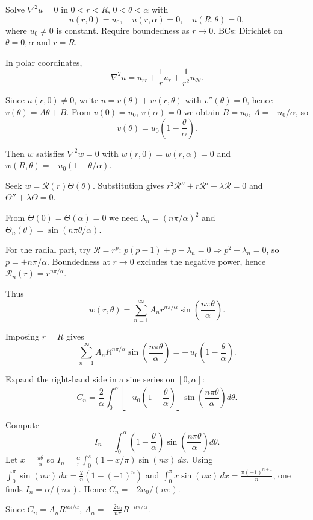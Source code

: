 \documentclass[a4paper,11pt]{article} %
\begin{document}
\begin{problembox}
Solve $\nabla^2 u=0$ in $0<r<R$, $0<\theta<\alpha$ with
\[
u(r,0)=u_0,\quad
u(r,\alpha)=0,\quad
u(R,\theta)=0,
\]
where $u_0\neq0$ is constant. Require boundedness as $r\to0$.
BCs: Dirichlet on $\theta=0,\alpha$ and $r=R$.
\end{problembox}

In polar coordinates,
\[
\nabla^2 u=u_{rr}+\frac1r u_r+\frac1{r^2}u_{\theta\theta}.
\]

Since $u(r,0)\neq0$, write $u=v(\theta)+w(r,\theta)$ with $v''(\theta)=0$, hence
$v(\theta)=A\theta+B$. From $v(0)=u_0$, $v(\alpha)=0$ we obtain
$B=u_0$, $A=-u_0/\alpha$, so
\[
v(\theta)=u_0\!\left(1-\frac{\theta}{\alpha}\right).
\]

Then $w$ satisfies $\nabla^2 w=0$ with
$w(r,0)=w(r,\alpha)=0$ and
$w(R,\theta)=-u_0(1-\theta/\alpha)$.

Seek $w=\mathcal R(r)\Theta(\theta)$. Substitution gives
$r^2\mathcal R''+r\mathcal R'-\lambda\mathcal R=0$ and
$\Theta''+\lambda\Theta=0$.

From $\Theta(0)=\Theta(\alpha)=0$ we need
$\lambda_n=(n\pi/\alpha)^2$ and
$\Theta_n(\theta)=\sin(n\pi\theta/\alpha)$.

For the radial part, try $\mathcal R=r^p$:
$p(p-1)+p-\lambda_n=0 \Rightarrow p^2-\lambda_n=0$,
so $p=\pm n\pi/\alpha$.
Boundedness at $r\to0$ excludes the negative power, hence
$\mathcal R_n(r)=r^{n\pi/\alpha}$.

Thus
\[
w(r,\theta)=\sum_{n=1}^\infty
A_n r^{n\pi/\alpha}
\sin\!\left(\frac{n\pi\theta}{\alpha}\right).
\]

Imposing $r=R$ gives
\[
\sum_{n=1}^\infty
A_n R^{n\pi/\alpha}
\sin\!\left(\frac{n\pi\theta}{\alpha}\right)
=
-\,u_0\!\left(1-\frac{\theta}{\alpha}\right).
\]

Expand the right-hand side in a sine series on $[0,\alpha]$:
\[
C_n=\frac{2}{\alpha}\int_0^\alpha
\!\left[-u_0\!\left(1-\frac{\theta}{\alpha}\right)\right]
\sin\!\left(\frac{n\pi\theta}{\alpha}\right)d\theta.
\]

Compute
\[
I_n=\int_0^\alpha
\left(1-\frac{\theta}{\alpha}\right)
\sin\!\left(\frac{n\pi\theta}{\alpha}\right)d\theta.
\]
Let $x=\frac{\pi\theta}{\alpha}$ so
$I_n=\frac{\alpha}{\pi}\int_0^\pi(1-x/\pi)\sin(nx)\,dx$.
Using
$\int_0^\pi\sin(nx)\,dx=\frac{2}{n}(1-(-1)^n)$ and
$\int_0^\pi x\sin(nx)\,dx=\frac{\pi(-1)^{n+1}}{n}$,
one finds $I_n=\alpha/(n\pi)$.
Hence $C_n=-2u_0/(n\pi)$.

Since $C_n=A_n R^{n\pi/\alpha}$,
$A_n=-\frac{2u_0}{n\pi}R^{-n\pi/\alpha}$.
\end{document}
